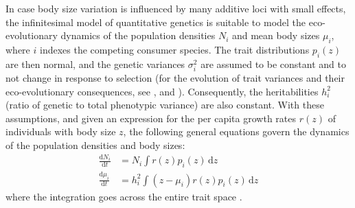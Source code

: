 \documentclass[12pt]{article}
\newcommand{\ud}{\text{d}}
\begin{document}
In case body size variation is influenced by many additive loci with small effects, the infinitesimal model of quantitative genetics \citep{Barton2017} is suitable to model the eco-evolutionary dynamics of the population densities $N_i$ and mean body sizes $\mu_i$, where $i$ indexes the competing consumer species. The trait distributions $p_i(z)$ are then normal, and the genetic variances $\sigma_i^2$ are assumed to be constant and to not change in response to selection (for the evolution of trait variances and their eco-evolutionary consequences, see \citealp{TaperCase1985, MullonLehmann2019, Barabasetal2022}, and \citealp{Wickmanetal2023}). Consequently, the heritabilities $h_i^2$ (ratio of genetic to total phenotypic variance) are also constant. With these assumptions, and given an expression for the per capita growth rates $r(z)$ of individuals with body size $z$, the following general equations govern the dynamics of the population densities and body sizes:
\begin{align}
  \label{eq-n-general}
  \frac{\ud N_i}{\ud t}
  &= N_i \int r(z) p_i(z) \,\ud z \\
  \label{eq-mu-general}
  \frac{\ud \mu_i}{\ud t}
  &= h_i^2
  \int (z - \mu_i) r(z) p_i(z) \,\ud z
\end{align}
where the integration goes across the entire trait space \citep{    Slatkin1979, Slatkin1980, TaperCase1985, Schreiberetal2011, Vasseuretal2011, Barabas2016, MullonLehmann2019, Pastore2021, Barabasetal2022, baruah2025when}.
\end{document}

